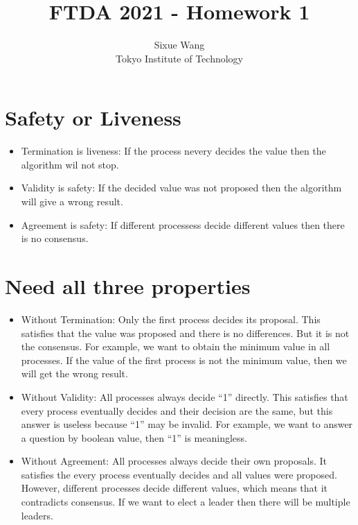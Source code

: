 \documentclass{article}
\title{FTDA 2021 - Homework 1}
\author{Sixue Wang\\Tokyo Institute of Technology}
\begin{document}
\maketitle

\section{Safety or Liveness}
  \begin{itemize}
    \item Termination is liveness: If the process nevery decides the value then the algorithm wil not stop.
    \item Validity is safety: If the decided value was not proposed then the algorithm will give a wrong result.
    \item Agreement is safety: If different processess decide different values then there is no consensus.
  \end{itemize}

\section{Need all three properties}
  \begin{itemize}
    \item Without Termination: Only the first process decides its proposal. This satisfies that the value was proposed and there is no differences. But it is not the consensus. For example, we want to obtain the minimum value in all processes. If the value of the first process is not the minimum value, then we will get the wrong result.
    \item Without Validity: All processes always decide ``1'' directly. This satisfies that every process eventually decides and their decision are the same, but this answer is useless because ``1'' may be invalid. For example, we want to answer a question by boolean value, then ``1'' is meaningless.
    \item Without Agreement: All processes always decide their own proposals. It satisfies the every process eventually decides and all values were proposed. However, different processes decide different values, which means that it contradicts consensus. If we want to elect a leader then there will be multiple leaders.
  \end{itemize}
\end{document}
